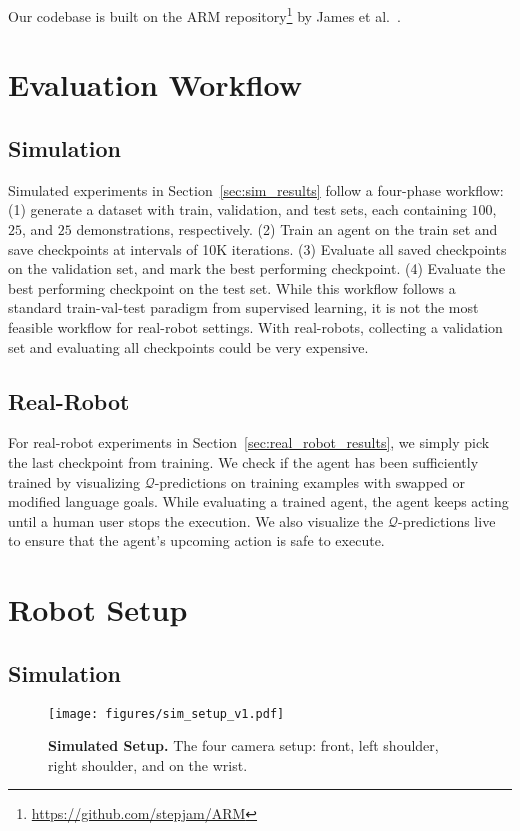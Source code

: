 \documentclass{article}
\newcommand{\secref}[1]{Section~\ref{#1}}
\begin{document}
Our codebase is built on the ARM repository\footnote{\url{https://github.com/stepjam/ARM}} by James et al.~\citep{c2farm}.  

\section{Evaluation Workflow}

\subsection{Simulation}
Simulated experiments in \secref{sec:sim_results} follow a four-phase workflow: (1) generate a dataset with train, validation, and test sets, each containing $100$, $25$, and $25$ demonstrations, respectively. (2) Train an agent on the train set and save checkpoints at intervals of 10K iterations. (3) Evaluate all saved checkpoints on the validation set, and mark the best performing checkpoint. (4) Evaluate the best performing checkpoint on the test set. While this workflow follows a standard train-val-test paradigm from supervised learning, it is not the most feasible workflow for real-robot settings. With real-robots, collecting a validation set and evaluating all checkpoints could be very expensive.  

\subsection{Real-Robot}

For real-robot experiments in \secref{sec:real_robot_results}, we simply pick the last checkpoint from training. We check if the agent has been sufficiently trained by visualizing $\mathcal{Q}$-predictions on training examples with swapped or modified language goals. While evaluating a trained agent, the agent keeps acting until a human user stops the execution. We also visualize the $\mathcal{Q}$-predictions live to ensure that the agent's upcoming action is safe to execute.

\newpage
\section{Robot Setup} \label{app:robot_setup}

\subsection{Simulation}

\begin{wrapfigure}[10]{r}{0.5\textwidth}
  \vspace{-0.60cm}
  \begin{center}
    \texttt{[image: figures/sim\_setup\_v1.pdf]}
  \caption{\textbf{Simulated Setup.} The four camera setup: front, left shoulder, right shoulder, and on the wrist.}
  \label{fig:sim_setup}
  \end{center}
  \vspace{-1cm}
\end{wrapfigure}
\end{document}
